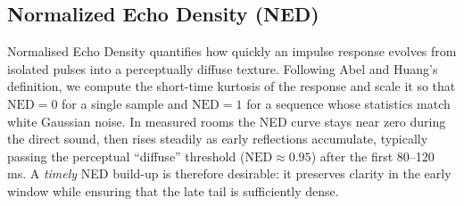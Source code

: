 \documentclass[journal]{IEEEtran}
\begin{document}


\subsection{Normalized Echo Density (NED)}
Normalised Echo Density quantifies how quickly an impulse response evolves from isolated pulses into a perceptually diffuse texture.  
Following Abel and Huang’s definition, we compute the short-time kurtosis of the response and scale it so that \(\text{NED}=0\) for a single sample and \(\text{NED}=1\) for a sequence whose statistics match white Gaussian noise. 
In measured rooms the NED curve stays near zero during the direct sound, then rises steadily as early reflections accumulate, typically passing the perceptual “diffuse” threshold (\(\text{NED}\!\approx\!0.95\)) after the first 80–120 ms.  
A \emph{timely} NED build-up is therefore desirable: it preserves clarity in the early window while ensuring that the late tail is sufficiently dense.
\end{document}
